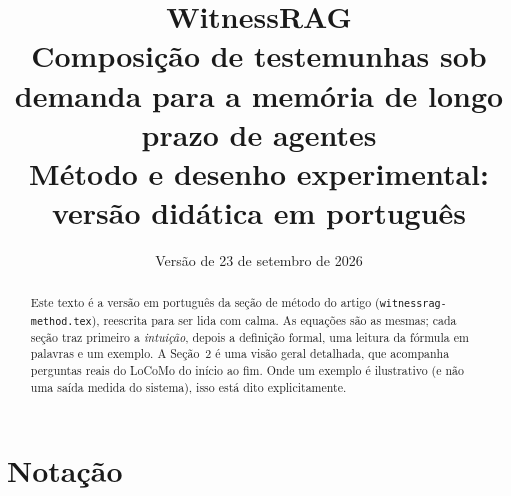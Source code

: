 \documentclass[11pt]{article}
\title{\textbf{WitnessRAG}\\[2pt]
\large Composição de testemunhas sob demanda para a memória de longo prazo de agentes\\[2pt]
\normalsize Método e desenho experimental: versão didática em português}
\author{}
\date{Versão de 23 de setembro de 2026}
\begin{document}
\maketitle

\begin{abstract}
Este texto é a versão em português da seção de método do artigo
(\texttt{witnessrag-method.tex}), reescrita para ser lida com calma. As
equações são as mesmas; cada seção traz primeiro a \emph{intuição}, depois a
definição formal, uma leitura da fórmula em palavras e um exemplo. A Seção~2
é uma visão geral detalhada, que acompanha perguntas reais do LoCoMo do
início ao fim. Onde um exemplo é ilustrativo (e não uma saída medida do
sistema), isso está dito explicitamente.
\end{abstract}

\tableofcontents
\newpage

\section*{Notação}
\end{document}
